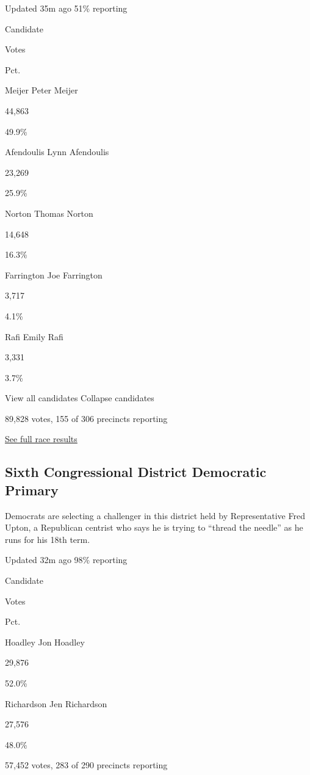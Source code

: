 Updated 35m ago 51\% reporting

Candidate

Votes

Pct.

 Meijer Peter Meijer

44,863

49.9\%

 Afendoulis Lynn Afendoulis

23,269

25.9\%

 Norton Thomas Norton

14,648

16.3\%

 Farrington Joe Farrington

3,717

4.1\%

 Rafi Emily Rafi

3,331

3.7\%

View all candidates Collapse candidates

89,828 votes, 155 of 306 precincts reporting

\href{https://www.nytimes3xbfgragh.onion/interactive/2020/08/04/us/elections/results-michigan-house-district-3-primary-election.html}{See
full race results}

\hypertarget{sixth-congressional-district-democratic-primary}{%
\subsection{Sixth Congressional District Democratic
Primary}\label{sixth-congressional-district-democratic-primary}}

Democrats are selecting a challenger in this district held by
Representative Fred Upton, a Republican centrist who says he is trying
to ``thread the needle'' as he runs for his 18th term.

Updated 32m ago 98\% reporting

Candidate

Votes

Pct.

 Hoadley Jon Hoadley

29,876

52.0\%

 Richardson Jen Richardson

27,576

48.0\%

57,452 votes, 283 of 290 precincts reporting

